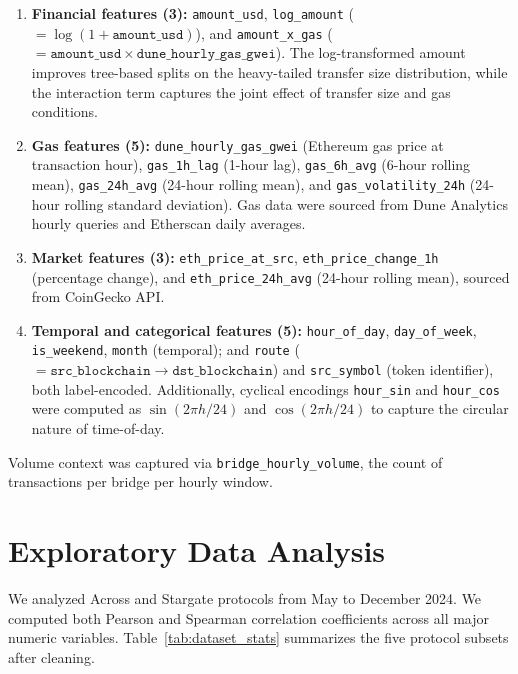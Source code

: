 \begin{enumerate}
    \item \textbf{Financial features (3):} \texttt{amount\_usd}, \texttt{log\_amount} ($= \log(1 + \texttt{amount\_usd})$), and \texttt{amount\_x\_gas} ($= \texttt{amount\_usd} \times \texttt{dune\_hourly\_gas\_gwei}$). The log-transformed amount improves tree-based splits on the heavy-tailed transfer size distribution, while the interaction term captures the joint effect of transfer size and gas conditions.

    \item \textbf{Gas features (5):} \texttt{dune\_hourly\_gas\_gwei} (Ethereum gas price at transaction hour), \texttt{gas\_1h\_lag} (1-hour lag), \texttt{gas\_6h\_avg} (6-hour rolling mean), \texttt{gas\_24h\_avg} (24-hour rolling mean), and \texttt{gas\_volatility\_24h} (24-hour rolling standard deviation). Gas data were sourced from Dune Analytics hourly queries and Etherscan daily averages.

    \item \textbf{Market features (3):} \texttt{eth\_price\_at\_src}, \texttt{eth\_price\_change\_1h} (percentage change), and \texttt{eth\_price\_24h\_avg} (24-hour rolling mean), sourced from CoinGecko API.

    \item \textbf{Temporal and categorical features (5):} \texttt{hour\_of\_day}, \texttt{day\_of\_week}, \texttt{is\_weekend}, \texttt{month} (temporal); and \texttt{route} ($= \texttt{src\_blockchain} \to \texttt{dst\_blockchain}$) and \texttt{src\_symbol} (token identifier), both label-encoded. Additionally, cyclical encodings \texttt{hour\_sin} and \texttt{hour\_cos} were computed as $\sin(2\pi h / 24)$ and $\cos(2\pi h / 24)$ to capture the circular nature of time-of-day.
\end{enumerate}

Volume context was captured via \texttt{bridge\_hourly\_volume}, the count of transactions per bridge per hourly window.


\section{Exploratory Data Analysis}\label{sec: data_analysis}

We analyzed Across and Stargate protocols from May to December 2024. We computed both Pearson and Spearman correlation coefficients across all major numeric variables. Table~\ref{tab:dataset_stats} summarizes the five protocol subsets after cleaning.

